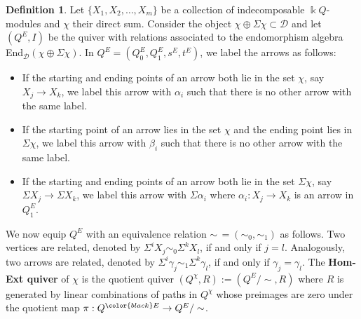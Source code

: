 \documentclass[12pt]{amsart}
\theoremstyle{plain}
\theoremstyle{definition}
\newtheorem{defn}{Definition}[section]
\theoremstyle{remark}
\begin{document}
\begin{defn} \label{defn: H-E quiver in D}
Let $\{X_1, X_2, \dots, X_m\}$ be a collection of {\color{black} indecomposable} $\Bbbk Q$-modules and $\chi$ their direct sum. Consider the object $\chi \oplus \Sigma \chi \subset \mathscr{D}$ and let $(Q^E,I)$ be the quiver with relations associated to the endomorphism algebra End$_{\mathscr{D}}(\chi \oplus \Sigma \chi)$. In $Q^E = (Q^E_0,Q^E_1,s^E, t^E)$, we label the arrows as follows:

\begin{itemize}
\item If the starting and ending points of an arrow both lie in the set $\chi$, say $X_j\to X_k$, we label this arrow with $\alpha_i$ such that there is no other arrow with the same label.

\item If the starting point of an arrow lies in the set $\chi$ and the ending point lies in $\Sigma \chi$, we label this arrow with $\beta_i$ such that there is no other arrow with the same label.

\item If the starting and ending points of an arrow both lie in the set $\Sigma \chi$, say $\Sigma X_j\to\Sigma X_k$, we label this arrow with $\Sigma \alpha_i$ {\color{black} where} $\alpha_i:X_j\to X_k$ is an arrow in $Q^E_1$.
\end{itemize}

We now equip $Q^E$ with an equivalence relation $\sim \, = (\sim_0, \sim_1)$ as follows. Two vertices are related, denoted by $\Sigma^iX_j \sim_0 \Sigma^kX_l$, if and only if $j = l$. Analogously, two arrows are related, denoted by $\Sigma^i\gamma_j \sim_1 \Sigma^k\gamma_l$, if and only if $\gamma_j = \gamma_l$. The \textbf{Hom-Ext quiver} of $\chi$ is the quotient quiver $(Q^\chi,R) := (Q^E / \sim,R)$ where $R$ is generated by linear combinations of paths in $Q^{\chi}$ whose preimages are zero under {the quotient map} {\color{black}$\pi:Q^{\color{black} E}\to Q^E/\sim$}.

\end{defn}
\end{document}
